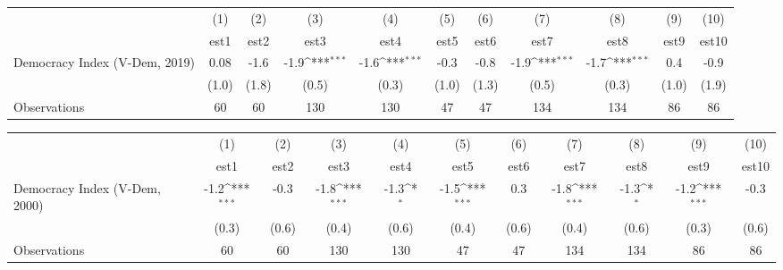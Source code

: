 {
\def\sym#1{\ifmmode^{#1}\else\(^{#1}\)\fi}
\begin{tabular}{l*{10}{c}}
                &\multicolumn{1}{c}{(1)}         &\multicolumn{1}{c}{(2)}         &\multicolumn{1}{c}{(3)}         &\multicolumn{1}{c}{(4)}         &\multicolumn{1}{c}{(5)}         &\multicolumn{1}{c}{(6)}         &\multicolumn{1}{c}{(7)}         &\multicolumn{1}{c}{(8)}         &\multicolumn{1}{c}{(9)}         &\multicolumn{1}{c}{(10)}         \\
                &     est1         &     est2         &     est3         &     est4         &     est5         &     est6         &     est7         &     est8         &     est9         &    est10         \\
Democracy Index (V-Dem, 2019)&     0.08         &     -1.6         &     -1.9\sym{***}&     -1.6\sym{***}&     -0.3         &     -0.8         &     -1.9\sym{***}&     -1.7\sym{***}&      0.4         &     -0.9         \\
                &    (1.0)         &    (1.8)         &    (0.5)         &    (0.3)         &    (1.0)         &    (1.3)         &    (0.5)         &    (0.3)         &    (1.0)         &    (1.9)         \\
Observations    &       60         &       60         &      130         &      130         &       47         &       47         &      134         &      134         &       86         &       86         \\
\end{tabular}
}
{
\def\sym#1{\ifmmode^{#1}\else\(^{#1}\)\fi}
\begin{tabular}{l*{10}{c}}
                &\multicolumn{1}{c}{(1)}         &\multicolumn{1}{c}{(2)}         &\multicolumn{1}{c}{(3)}         &\multicolumn{1}{c}{(4)}         &\multicolumn{1}{c}{(5)}         &\multicolumn{1}{c}{(6)}         &\multicolumn{1}{c}{(7)}         &\multicolumn{1}{c}{(8)}         &\multicolumn{1}{c}{(9)}         &\multicolumn{1}{c}{(10)}         \\
                &     est1         &     est2         &     est3         &     est4         &     est5         &     est6         &     est7         &     est8         &     est9         &    est10         \\
Democracy Index (V-Dem, 2000)&     -1.2\sym{***}&     -0.3         &     -1.8\sym{***}&     -1.3\sym{*}  &     -1.5\sym{***}&      0.3         &     -1.8\sym{***}&     -1.3\sym{*}  &     -1.2\sym{***}&     -0.3         \\
                &    (0.3)         &    (0.6)         &    (0.4)         &    (0.6)         &    (0.4)         &    (0.6)         &    (0.4)         &    (0.6)         &    (0.3)         &    (0.6)         \\
Observations    &       60         &       60         &      130         &      130         &       47         &       47         &      134         &      134         &       86         &       86         \\
\end{tabular}
}
